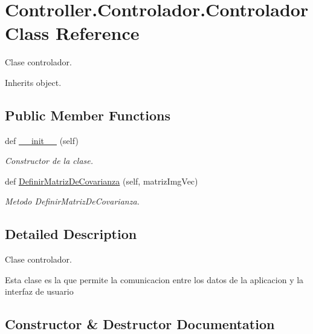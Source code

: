 \hypertarget{class_controller_1_1_controlador_1_1_controlador}{}\section{Controller.\+Controlador.\+Controlador Class Reference}
\label{class_controller_1_1_controlador_1_1_controlador}


Clase controlador.  




Inherits object.

\subsection*{Public Member Functions}
\begin{DoxyCompactItemize}
\item 
def \hyperlink{class_controller_1_1_controlador_1_1_controlador_ad30f895c86fb2085fbd3b2c0a1c9f38c}{\+\_\+\+\_\+init\+\_\+\+\_\+} (self)
\begin{DoxyCompactList}\small\item\em Constructor de la clase. \end{DoxyCompactList}\item 
def \hyperlink{class_controller_1_1_controlador_1_1_controlador_a4c342a4b7f56c2f8a566cdf62030816c}{Definir\+Matriz\+De\+Covarianza} (self, matriz\+Img\+Vec)
\begin{DoxyCompactList}\small\item\em Metodo Definir\+Matriz\+De\+Covarianza. \end{DoxyCompactList}\end{DoxyCompactItemize}


\subsection{Detailed Description}
Clase controlador. 

Esta clase es la que permite la comunicacion entre los datos de la aplicacion y la interfaz de usuario 

\subsection{Constructor \& Destructor Documentation}
\mbox{\label{class_controller_1_1_controlador_1_1_controlador_ad30f895c86fb2085fbd3b2c0a1c9f38c}} 
